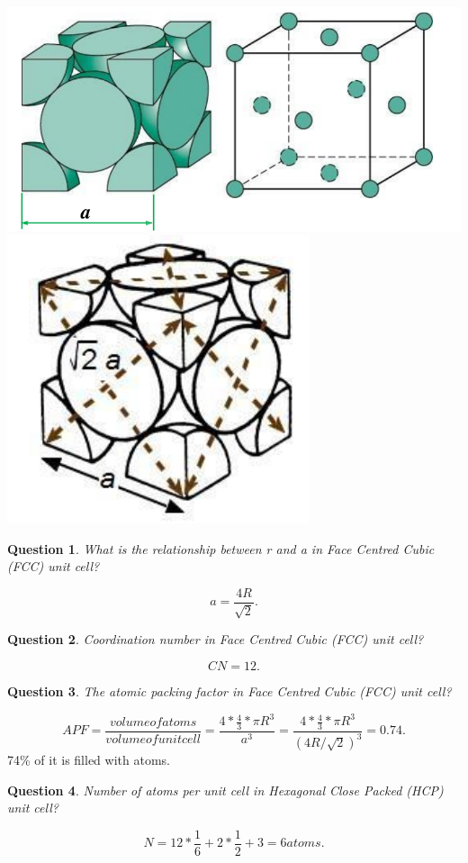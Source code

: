 \documentclass[13]{article}
\newtheorem{exer}{Question}
\begin{document}
\begin{center}
\includegraphics[scale=0.5]{figures/10.png} \includegraphics[scale=0.5]{figures/11.png}
\end{center}
\begin{exer}
What is the relationship between r and a in Face Centred Cubic (FCC) unit cell?
\end{exer}
\[
	a = \frac{4R}{\sqrt{2}} 
.\] 
\begin{exer}
Coordination number in Face Centred Cubic (FCC) unit cell?
\end{exer}
\[
CN=12
.\] 
\begin{exer}
The atomic packing factor in Face Centred Cubic (FCC) unit cell?
\end{exer}
\[
	APF = \frac{volume of atoms}{volume of unit cell} = \frac{4* \frac{4}{3} * \pi R^3}{a^3}= \frac{4* \frac{4}{3} * \pi R^3}{(4R/\sqrt{2})^3} = 0.74
.\] 
74\% of it is filled with atoms. 
\begin{exer}
Number of atoms per unit cell in  Hexagonal Close Packed (HCP) unit cell?
\end{exer}
\[
N = 12* \frac{1}{6}  + 2 * \frac{1}{2} + 3 = 6 atoms
.\]
\end{document}
